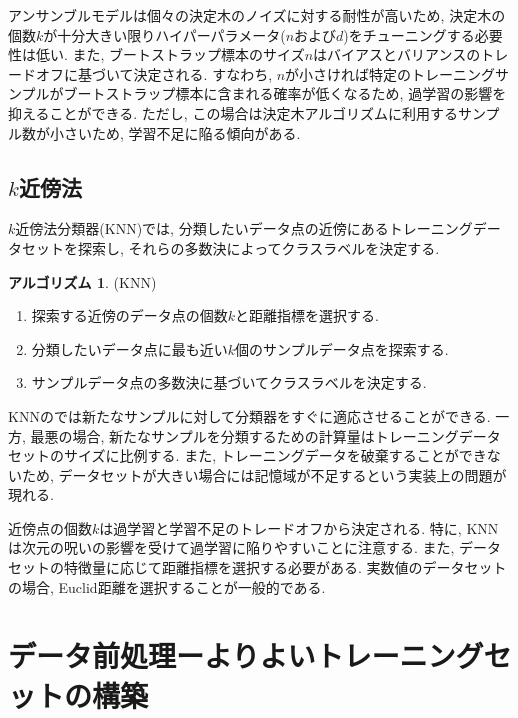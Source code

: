 \documentclass[uplatex]{jsarticle}
\theoremstyle{definition}
\newtheorem{algorithm}[definition]{アルゴリズム}
\numberwithin{equation}{section}
\begin{document}
アンサンブルモデルは個々の決定木のノイズに対する耐性が高いため, 決定木の個数$k$が十分大きい限りハイパーパラメータ($n$および$d$)をチューニングする必要性は低い.
また, ブートストラップ標本のサイズ$n$はバイアスとバリアンスのトレードオフに基づいて決定される.
すなわち, $n$が小さければ特定のトレーニングサンプルがブートストラップ標本に含まれる確率が低くなるため, 過学習の影響を抑えることができる.
ただし, この場合は決定木アルゴリズムに利用するサンプル数が小さいため, 学習不足に陥る傾向がある.

\subsection{$k$近傍法}
$k$近傍法分類器(KNN)では, 分類したいデータ点の近傍にあるトレーニングデータセットを探索し, それらの多数決によってクラスラベルを決定する.
\begin{algorithm}
    (KNN)
    \begin{enumerate}
        \item
        探索する近傍のデータ点の個数$k$と距離指標を選択する.

        \item
        分類したいデータ点に最も近い$k$個のサンプルデータ点を探索する.

        \item
        サンプルデータ点の多数決に基づいてクラスラベルを決定する.
    \end{enumerate}
\end{algorithm}
KNNのでは新たなサンプルに対して分類器をすぐに適応させることができる.
一方, 最悪の場合, 新たなサンプルを分類するための計算量はトレーニングデータセットのサイズに比例する.
また, トレーニングデータを破棄することができないため, データセットが大きい場合には記憶域が不足するという実装上の問題が現れる.

近傍点の個数$k$は過学習と学習不足のトレードオフから決定される.
特に, KNNは次元の呪いの影響を受けて過学習に陥りやすいことに注意する.
また, データセットの特徴量に応じて距離指標を選択する必要がある.
実数値のデータセットの場合, Euclid距離を選択することが一般的である.


\section{データ前処理ーよりよいトレーニングセットの構築}
\end{document}
